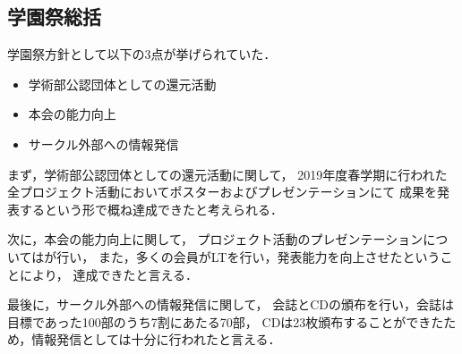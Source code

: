 \subsection*{学園祭総括}

学園祭方針として以下の3点が挙げられていた．

\begin{itemize}
    \item 学術部公認団体としての還元活動
    \item 本会の能力向上
    \item サークル外部への情報発信
\end{itemize}

まず，学術部公認団体としての還元活動に関して，
2019年度春学期に行われた全プロジェクト活動においてポスターおよびプレゼンテーションにて
成果を発表するという形で概ね達成できたと考えられる．

次に，本会の能力向上に関して，
プロジェクト活動のプレゼンテーションについては\firstGrade{}が行い，
また，多くの会員がLTを行い，発表能力を向上させたということにより，
達成できたと言える．

最後に，サークル外部への情報発信に関して，
会誌とCDの頒布を行い，会誌は目標であった100部のうち7割にあたる70部，
CDは23枚頒布することができたため，情報発信としては十分に行われたと言える．
